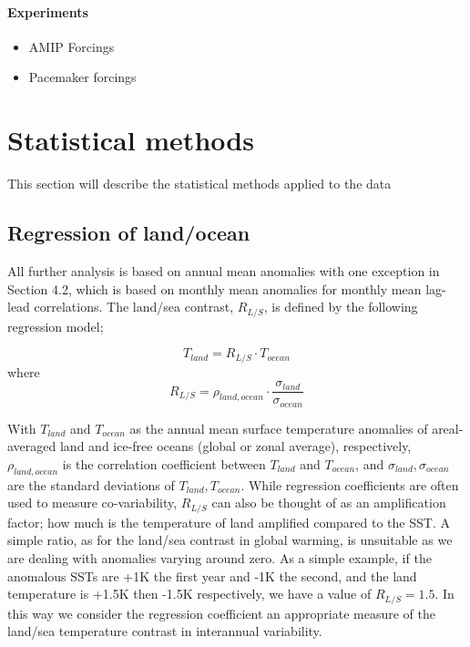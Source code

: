\paragraph{Experiments}
\begin{itemize}
	\item AMIP Forcings
	\item Pacemaker forcings
\end{itemize}


\section{Statistical methods}

This section will describe the statistical methods applied to the data


\subsection{Regression of land/ocean}


All further analysis is based on annual mean anomalies with one exception in 
Section 4.2, which is based on monthly mean anomalies for monthly mean lag-lead
correlations. The land/sea contrast, $R_{L/S}$, is defined by the following 
regression model;

\begin{equation}
T_{land} = R_{L/S} \cdot T_{ocean}
\end{equation}
where
\begin{equation}
	R_{L/S} = \rho_{land,ocean}\cdot \frac{\sigma_{land}}{\sigma_{ocean}}
\end{equation}

With $T_{land}$ and $T_{ocean}$ as the annual mean surface temperature anomalies 
of areal-averaged land and ice-free oceans (global or zonal average), 
respectively, $\rho_{land,ocean}$ is the correlation coefficient between 
$T_{land}$ and $T_{ocean}$, and $\sigma_{land}, \sigma_{ocean}$ are the standard 
deviations of $T_{land}, T_{ocean}$. While regression coefficients are often 
used to measure co-variability, $R_{L/S}$ can also be thought of as an 
amplification factor; how much is the temperature of land amplified compared to 
the SST. A simple ratio, as for the land/sea contrast in global warming, is 
unsuitable as we are dealing with anomalies varying around zero. As a simple 
example, if the anomalous SSTs are +1K the first year and -1K the second, and 
the land temperature is +1.5K then -1.5K respectively, we have a value of 
$R_{L/S} = 1.5$. In this way we consider the regression coefficient an 
appropriate measure of the land/sea temperature contrast in interannual 
variability.
